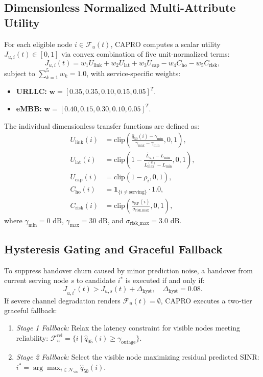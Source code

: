 \documentclass[conference]{IEEEtran}
\begin{document}
\subsection{Dimensionless Normalized Multi-Attribute Utility}
For each eligible node $i \in \mathcal{F}_u(t)$, CAPRO computes a scalar utility $J_{u,i}(t) \in [0, 1]$ via convex combination of five unit-normalized terms:
\begin{equation}
J_{u,i}(t) = w_1 U_{\text{link}} + w_2 U_{\text{lat}} + w_3 U_{\text{cap}} - w_4 C_{\text{ho}} - w_5 C_{\text{risk}},
\end{equation}
subject to $\sum_{k=1}^5 w_k = 1.0$, with service-specific weights:
\begin{itemize}
    \item \textbf{URLLC:} $\mathbf{w} = [0.35, 0.35, 0.10, 0.15, 0.05]^T$.
    \item \textbf{eMBB:} $\mathbf{w} = [0.40, 0.15, 0.30, 0.10, 0.05]^T$.
\end{itemize}
The individual dimensionless transfer functions are defined as:
\begin{align}
U_{\text{link}}(i) &= \text{clip}\left( \frac{\hat{q}_{50}(i) - \gamma_{\text{min}}}{\gamma_{\text{max}} - \gamma_{\text{min}}}, 0, 1 \right), \\
U_{\text{lat}}(i) &= \text{clip}\left( 1 - \frac{\hat{L}_{u,i} - L_{\text{min}}}{L_{\text{max}}^{(u)} - L_{\text{min}}}, 0, 1 \right), \\
U_{\text{cap}}(i) &= \text{clip}\left( 1 - \rho_i, 0, 1 \right), \\
C_{\text{ho}}(i) &= \mathbf{1}_{\{i \ne \text{serving}\}} \cdot 1.0, \\
C_{\text{risk}}(i) &= \text{clip}\left( \frac{s_{\text{RF}}(i)}{\sigma_{\text{risk\_max}}}, 0, 1 \right),
\end{align}
where $\gamma_{\text{min}} = 0\text{ dB}$, $\gamma_{\text{max}} = 30\text{ dB}$, and $\sigma_{\text{risk\_max}} = 3.0\text{ dB}$.

\subsection{Hysteresis Gating and Graceful Fallback}
To suppress handover churn caused by minor prediction noise, a handover from current serving node $s$ to candidate $i^*$ is executed if and only if:
\begin{equation}
J_{u, i^*}(t) > J_{u, s}(t) + \Delta_{\text{hyst}}, \quad \Delta_{\text{hyst}} = 0.08.
\end{equation}
If severe channel degradation renders $\mathcal{F}_u(t) = \emptyset$, CAPRO executes a two-tier graceful fallback:
\begin{enumerate}
    \item \textit{Stage 1 Fallback:} Relax the latency constraint for visible nodes meeting reliability: $\mathcal{F}_u^{\text{rel}} = \{i \mid \hat{q}_{05}(i) \ge \gamma_{\text{outage}}\}$.
    \item \textit{Stage 2 Fallback:} Select the visible node maximizing residual predicted SINR: $i^* = \arg\max_{i \in \mathcal{N}_{\text{vis}}} \hat{q}_{50}(i)$.
\end{enumerate}
\end{document}

